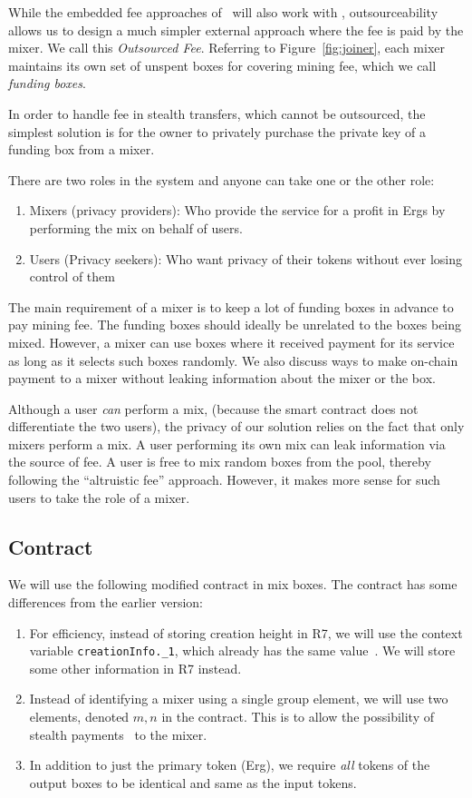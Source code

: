 \documentclass[runningheads]{llncs}
\begin{document}
While the embedded fee approaches of~\cite{zerojoin} will also work with \algname, outsourceability allows us to design a much simpler external approach where the fee is paid by the mixer. We call this {\em Outsourced Fee}. Referring to Figure~\ref{fig:joiner}, each mixer maintains its own set of unspent boxes for covering mining fee, which we call {\em funding boxes}.

In order to handle fee in stealth transfers, which cannot be outsourced, the simplest solution is for the owner to privately purchase the private key of a funding box from a mixer.

There are two roles in the system and anyone can take one or the other role:
\begin{enumerate}
\item Mixers (privacy providers): Who provide the service for a profit in Ergs by performing the mix on behalf of users.
\item Users (Privacy seekers): Who want privacy of their tokens without ever losing control of them
\end{enumerate}

The main requirement of a mixer is to keep a lot of funding boxes in advance to pay mining fee.
The funding boxes should ideally be unrelated to the boxes being mixed. However, a mixer can use boxes where it received payment for its service as long as it selects such boxes randomly. We also discuss ways to make on-chain payment to a mixer without leaking information about the mixer or the box.

Although a user {\em can} perform a mix, (because the smart contract does not differentiate the two users), the privacy of our solution
relies on the fact that only mixers perform a mix. A user performing its own mix can leak information via the source of fee.
A user is free to mix random boxes from the pool, thereby following the ``altruistic fee'' approach. However, it makes more sense for such users to take the role of a mixer.


\subsection{Contract}

We will use the following modified contract in mix boxes. The contract has some differences from the earlier version:
\begin{enumerate}
\item For efficiency, instead of storing creation height in R7, we will use the context variable \texttt{creationInfo.\_1}, which already has the same value~\cite{ergo-data-model}.
We will store some other information in R7 instead.
\item Instead of identifying a mixer using a single group element, we will use two elements, denoted $m, n$ in the contract. This is to allow the possibility of stealth payments~\cite{stealth-payments} to the mixer.
\item In addition to just the primary token (Erg), we require {\em all} tokens of the output boxes to be identical and same as the input tokens.
\end{enumerate}
\end{document}
